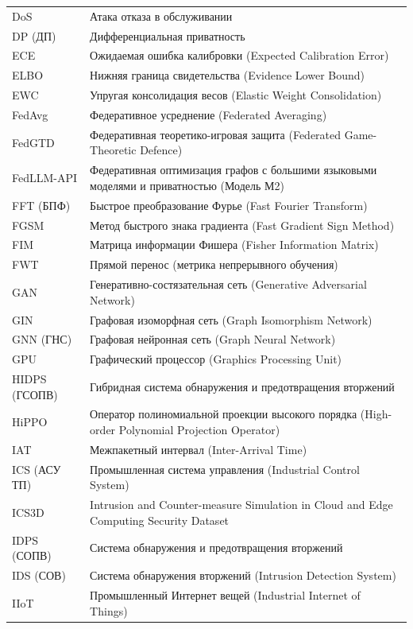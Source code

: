 \begin{longtable}{@{}p{3.8cm} p{10cm}@{}}
DoS & Атака отказа в обслуживании \\
DP (ДП) & Дифференциальная приватность \\
ECE & Ожидаемая ошибка калибровки (Expected Calibration Error) \\
ELBO & Нижняя граница свидетельства (Evidence Lower Bound) \\
EWC & Упругая консолидация весов (Elastic Weight Consolidation) \\
FedAvg & Федеративное усреднение (Federated Averaging) \\
FedGTD & Федеративная теоретико-игровая защита (Federated Game-Theoretic Defence) \\
FedLLM-API & Федеративная оптимизация графов с большими языковыми моделями и приватностью (Модель М2) \\
FFT (БПФ) & Быстрое преобразование Фурье (Fast Fourier Transform) \\
FGSM & Метод быстрого знака градиента (Fast Gradient Sign Method) \\
FIM & Матрица информации Фишера (Fisher Information Matrix) \\
FWT & Прямой перенос (метрика непрерывного обучения) \\
GAN & Генеративно-состязательная сеть (Generative Adversarial Network) \\
GIN & Графовая изоморфная сеть (Graph Isomorphism Network) \\
GNN (ГНС) & Графовая нейронная сеть (Graph Neural Network) \\
GPU & Графический процессор (Graphics Processing Unit) \\
HIDPS (ГСОПВ) & Гибридная система обнаружения и предотвращения вторжений \\
HiPPO & Оператор полиномиальной проекции высокого порядка (High-order Polynomial Projection Operator) \\
IAT & Межпакетный интервал (Inter-Arrival Time) \\
ICS (АСУ ТП) & Промышленная система управления (Industrial Control System) \\
ICS3D & Intrusion and Counter-measure Simulation in Cloud and Edge Computing Security Dataset \\
IDPS (СОПВ) & Система обнаружения и предотвращения вторжений \\
IDS (СОВ) & Система обнаружения вторжений (Intrusion Detection System) \\
IIoT & Промышленный Интернет вещей (Industrial Internet of Things) \\

\end{longtable}
